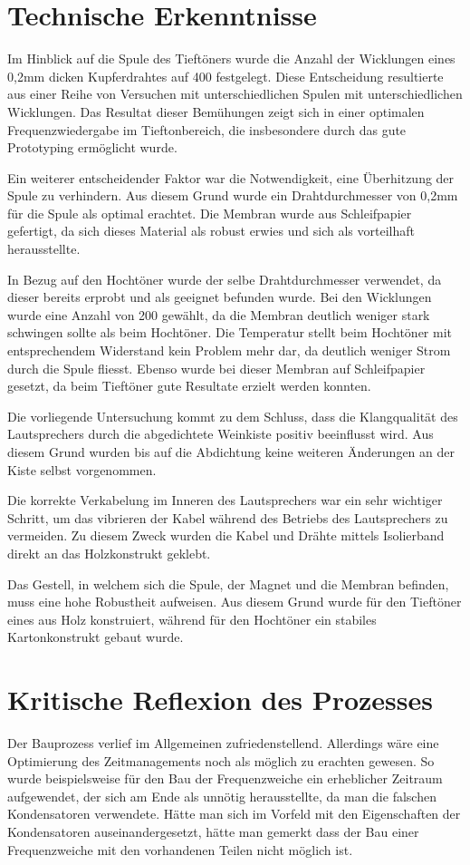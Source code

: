 \documentclass[a4paper,11pt]{report}
\begin{document}
\section{Technische Erkenntnisse}
Im Hinblick auf die Spule des Tieftöners wurde die Anzahl der Wicklungen eines 0,2mm dicken Kupferdrahtes auf 400 festgelegt. Diese Entscheidung resultierte aus einer Reihe von Versuchen mit unterschiedlichen Spulen mit unterschiedlichen Wicklungen. Das Resultat dieser Bemühungen zeigt sich in einer optimalen Frequenzwiedergabe im Tieftonbereich, die insbesondere durch das gute Prototyping ermöglicht wurde.

Ein weiterer entscheidender Faktor war die Notwendigkeit, eine Überhitzung der Spule zu verhindern. Aus diesem Grund wurde ein Drahtdurchmesser von 0,2mm für die Spule als optimal erachtet. Die Membran wurde aus Schleifpapier gefertigt, da sich dieses Material als robust erwies und sich als vorteilhaft herausstellte. 

In Bezug auf den Hochtöner wurde der selbe Drahtdurchmesser verwendet, da dieser bereits erprobt und als geeignet befunden wurde. Bei den Wicklungen wurde eine Anzahl von 200 gewählt, da die Membran deutlich weniger stark schwingen sollte als beim Hochtöner. Die Temperatur stellt beim Hochtöner mit entsprechendem Widerstand kein Problem mehr dar, da deutlich weniger Strom durch die Spule fliesst. Ebenso wurde bei dieser Membran auf Schleifpapier gesetzt, da beim Tieftöner gute Resultate erzielt werden konnten.

Die vorliegende Untersuchung kommt zu dem Schluss, dass die Klangqualität des Lautsprechers durch die abgedichtete Weinkiste positiv beeinflusst wird. Aus diesem Grund wurden bis auf die Abdichtung keine weiteren Änderungen an der Kiste selbst vorgenommen.

Die korrekte Verkabelung im Inneren des Lautsprechers war ein sehr wichtiger Schritt, um das vibrieren der Kabel während des Betriebs des Lautsprechers zu vermeiden. Zu diesem Zweck wurden die Kabel und Drähte mittels Isolierband direkt an das Holzkonstrukt geklebt.

Das Gestell, in welchem sich die Spule, der Magnet und die Membran befinden, muss eine hohe Robustheit aufweisen. Aus diesem Grund wurde für den Tieftöner eines aus Holz konstruiert, während für den Hochtöner ein stabiles Kartonkonstrukt gebaut wurde.

\section{Kritische Reflexion des Prozesses}
Der Bauprozess verlief im Allgemeinen zufriedenstellend. Allerdings wäre eine Optimierung des Zeitmanagements noch als möglich zu erachten gewesen. So wurde beispielsweise für den Bau der Frequenzweiche ein erheblicher Zeitraum aufgewendet, der sich am Ende als unnötig herausstellte, da man die falschen Kondensatoren verwendete. Hätte man sich im Vorfeld mit den Eigenschaften der Kondensatoren auseinandergesetzt, hätte man gemerkt dass der Bau einer Frequenzweiche mit den vorhandenen Teilen nicht möglich ist.
\end{document}
